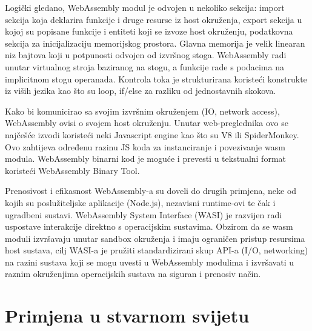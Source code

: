 \documentclass[seminarskirad]{fer}
\begin{document}
Logički gledano, WebAssembly modul je odvojen u nekoliko sekcija: import sekcija koja deklarira funkcije i druge resurse iz host okruženja, export sekcija u kojoj su popisane funkcije i entiteti koji se izvoze host okruženju, podatkovna sekcija za inicijalizaciju memorijskog prostora. Glavna memorija je velik linearan niz bajtova koji u potpunosti odvojen od izvršnog stoga. WebAssembly radi unutar virtualnog stroja baziranog na stogu, a funkcije rade s podacima na implicitnom stogu operanada. Kontrola toka je strukturirana koristeći konstrukte iz viših jezika kao što su loop, if/else za razliku od jednostavnih skokova.

Kako bi komunicirao sa svojim izvršnim okruženjem (IO, network access), WebAssembly ovisi o svojem host okruženju. Unutar web-preglednika ovo se najčešće izvodi koristeći neki Javascript engine kao što su V8 ili SpiderMonkey. Ovo zahtijeva određenu razinu JS koda za instanciranje i povezivanje wasm modula. WebAssembly binarni kod je moguće i prevesti u tekstualni format koristeći WebAssembly Binary Tool.

Prenosivost i efikasnost WebAssembly-a su doveli do drugih primjena, neke od kojih su poslužiteljske aplikacije (Node.js), nezavisni runtime-ovi te čak i ugradbeni sustavi. WebAssembly System Interface (WASI) je razvijen radi uspostave interakcije direktno s operacijskim sustavima. Obzirom da se wasm moduli izvršavaju unutar sandbox okruženja i imaju ograničen pristup resursima host sustava, cilj WASI-a je pružiti standardizirani skup API-a (I/O, networking) na razini sustava koji se mogu uvesti u WebAssembly modulima i izvršavati u raznim okruženjima operacijskih sustava na siguran i prenosiv način.

\chapter{Primjena u stvarnom svijetu}
\label{pog:realworldusage}
\end{document}
